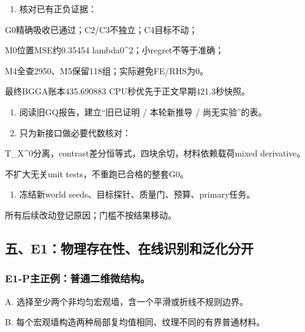 \documentclass[
  10pt,
  a4paper,
]{article}
\providecommand{\tightlist}{%
  \setlength{\itemsep}{0pt}\setlength{\parskip}{0pt}}
\providecommand{\tightlist}{\setlength{\itemsep}{1pt}\setlength{\parskip}{1pt}}
\begin{document}
\begin{enumerate}
\def\labelenumi{\arabic{enumi}.}
\tightlist
\item
  核对已有正负证据：
\end{enumerate}

G0精确吸收已通过；C2/C3不独立；C4目标不动；

M0位置MSE约0.35454 lambda0\^{}2；小regret不等于准确；

M4全查2950、M5保留118组；实际避免FE/RHS为0。

最终BGGA账本435.690883 CPU秒优先于正文早期421.3秒快照。

\begin{enumerate}
\def\labelenumi{\arabic{enumi}.}
\setcounter{enumi}{1}
\item
  阅读旧GQ报告，建立``旧已证明 / 本轮新推导 / 尚无实验''的表。
\item
  只为新接口做必要代数核对：
\end{enumerate}

T\_X\^{}0分离，contrast差分恒等式，四块余切，材料依赖载荷mixed
derivative。

不扩大无关unit tests，不重跑已合格的整套G0。

\begin{enumerate}
\def\labelenumi{\arabic{enumi}.}
\setcounter{enumi}{3}
\tightlist
\item
  冻结新world seeds、目标探针、质量门、预算、primary任务。
\end{enumerate}

所有后续改动登记原因；门槛不按结果移动。

\hypertarget{ux4e94e1ux7269ux7406ux5b58ux5728ux6027ux5728ux7ebfux8bc6ux522bux548cux6cdbux5316ux5206ux5f00}{%
\subsection{五、E1：物理存在性、在线识别和泛化分开}\label{ux4e94e1ux7269ux7406ux5b58ux5728ux6027ux5728ux7ebfux8bc6ux522bux548cux6cdbux5316ux5206ux5f00}}

\hypertarget{e1-pux4e3bux6b63ux4f8bux666eux901aux4e8cux7ef4ux5faeux7ed3ux6784}{%
\subsubsection{E1-P主正例：普通二维微结构。}\label{e1-pux4e3bux6b63ux4f8bux666eux901aux4e8cux7ef4ux5faeux7ed3ux6784}}

A. 选择至少两个非均匀宏观墙，含一个平滑或折线不规则边界。

B. 每个宏观墙构造两种局部复均值相同、纹理不同的有界普通材料。
\end{document}
